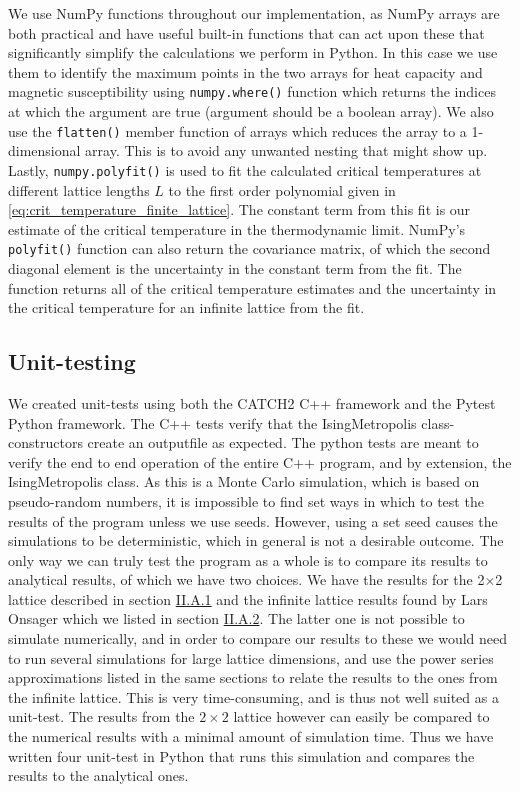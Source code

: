 \documentclass[reprint,english,notitlepage]{revtex4-1}  %
\begin{document}
We use NumPy \citep{numpy} functions throughout our implementation, as NumPy arrays are both practical and have useful built-in functions that can act upon these that significantly simplify the calculations we perform in Python. In this case we use them to identify the maximum points in the two arrays for heat capacity and magnetic susceptibility using \verb+numpy.where()+ function which returns the indices at which the argument are true (argument should be a boolean array). We also use the \verb+flatten()+ member function of arrays which reduces the array to a 1-dimensional array. This is to avoid any unwanted nesting that might show up. Lastly, \verb+numpy.polyfit()+ is used to fit the calculated critical temperatures at different lattice lengths $L$ to the first order polynomial given in \eqref{eq:crit_temperature_finite_lattice}. The constant term from this fit is our estimate of the critical temperature in the thermodynamic limit. NumPy's \verb+polyfit()+ function can also return the covariance matrix, of which the second diagonal element is the uncertainty in the constant term from the fit. The function returns all of the critical temperature estimates and the uncertainty in the critical temperature for an infinite lattice from the fit.


\subsection{Unit-testing} \label{sec:III:B}

We created unit-tests using both the CATCH2 C++ framework and the Pytest Python framework. The C++ tests verify that the IsingMetropolis class-constructors create an outputfile as expected. The python tests are meant to verify the end to end operation of the entire C++ program, and by extension, the IsingMetropolis class. As this is a Monte Carlo simulation, which is based on pseudo-random numbers, it is impossible to find set ways in which to test the results of the program unless we use seeds. However, using a set seed causes the simulations to be deterministic, which in general is not a desirable outcome. The only way we can truly test the program as a whole is to compare its results to analytical results, of which we have two choices. We have the results for the 2$\times$2 lattice described in section \hyperref[sec:II.A.i]{II.A.1} and the infinite lattice results found by Lars Onsager \citep{L.Onsager1944} which we listed in section \hyperref[sec:II.A.ii]{II.A.2}. The latter one is not possible to simulate numerically, and in order to compare our results to these we would need to run several simulations for large lattice dimensions, and use the power series approximations listed in the same sections to relate the results to the ones from the infinite lattice. This is very time-consuming, and is thus not well suited as a unit-test. The results from the $2\times2$ lattice however can easily be compared to the numerical results with a minimal amount of simulation time. Thus we have written four unit-test in Python that runs this simulation and compares the results to the analytical ones.     
\end{document}

